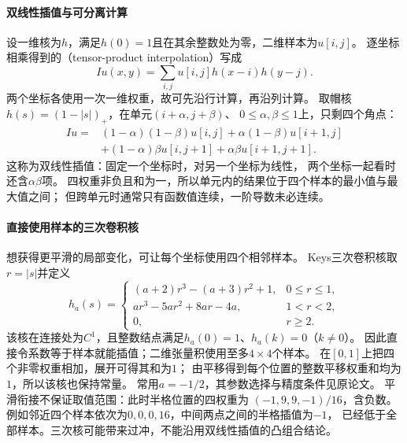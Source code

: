 \paragraph{双线性插值与可分离计算}
设一维核为$h$，满足$h(0)=1$且在其余整数处为零，二维样本为$u[i,j]$。
逐坐标相乘得到的（tensor-product interpolation）写成
\[
 Iu(x,y)=\sum_{i,j}u[i,j]h(x-i)h(y-j).
\]
两个坐标各使用一次一维权重，故可先沿行计算，再沿列计算。
取帽核$h(s)=(1-|s|)_+$，在单元$(i+\alpha,j+\beta)$、
$0\leq\alpha,\beta\leq1$上，只剩四个角点：
\begin{equation}
 \begin{aligned}
 Iu={}&(1-\alpha)(1-\beta)u[i,j]+\alpha(1-\beta)u[i+1,j]\\
 &+(1-\alpha)\beta u[i,j+1]+\alpha\beta u[i+1,j+1].
 \end{aligned}
 \label{eq:functional-bilinear-interpolation}
\end{equation}
这称为双线性插值：固定一个坐标时，对另一个坐标为线性，
两个坐标一起看时还含$\alpha\beta$项。
四权重非负且和为一，所以单元内的结果位于四个样本的最小值与最大值之间；
但跨单元时通常只有函数值连续，一阶导数未必连续。

\paragraph{直接使用样本的三次卷积核}
想获得更平滑的局部变化，可让每个坐标使用四个相邻样本。
Keys三次卷积核取$r=|s|$并定义
\[
 h_a(s)=
 \begin{cases}
 (a+2)r^3-(a+3)r^2+1,&0\leq r\leq1,\\
 ar^3-5ar^2+8ar-4a,&1<r<2,\\
 0,&r\geq2.
 \end{cases}
\]
该核在连接处为$C^1$，且整数结点满足$h_a(0)=1$、$h_a(k)=0$（$k\neq0$）。
因此直接令系数等于样本就能插值；二维张量积使用至多$4\times4$个样本。
在$[0,1]$上把四个非零权重相加，展开可得其和为$1$；
由平移得到每个位置的整数平移权重和均为$1$，所以该核也保持常量。
常用$a=-1/2$，其参数选择与精度条件见原论文。
平滑衔接不保证取值范围：此时半格位置的四权重为
$(-1,9,9,-1)/16$，含负数。
例如邻近四个样本依次为$0,0,0,16$，中间两点之间的半格插值为$-1$，
已经低于全部样本。三次核可能带来过冲，不能沿用双线性插值的凸组合结论。

